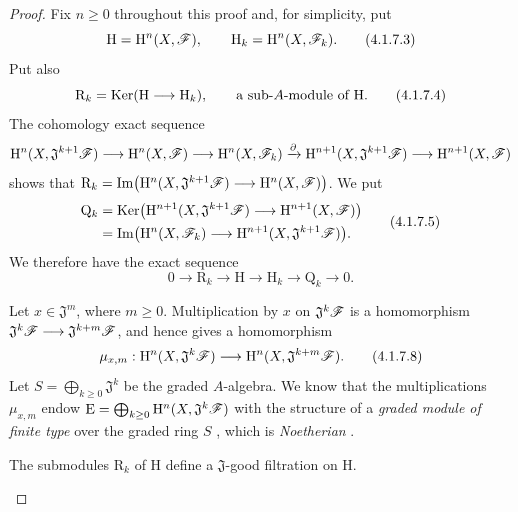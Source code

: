 \begin{proof}
Fix $n\geq0$ throughout this proof and, for simplicity, put
\[
  \mathrm{H}=\mathrm{H}^n(X,\mathscr{F}),
  \qquad
  \mathrm{H}_k=\mathrm{H}^n(X,\mathscr{F}_k).
  \tag{4.1.7.3}
  \label{III.4.1.7.3}
\]
Put also
\[
  \mathrm{R}_k
  =
  \operatorname{Ker}(\mathrm{H}\longrightarrow\mathrm{H}_k),
  \qquad
  \text{a sub-$A$-module of $\mathrm{H}$.}
  \tag{4.1.7.4}
  \label{III.4.1.7.4}
\]
The cohomology exact sequence
\[
  \mathrm{H}^n(X,\mathfrak{J}^{k+1}\mathscr{F})
  \longrightarrow
  \mathrm{H}^n(X,\mathscr{F})
  \longrightarrow
  \mathrm{H}^n(X,\mathscr{F}_k)
  \xrightarrow{\partial}
  \mathrm{H}^{n+1}(X,\mathfrak{J}^{k+1}\mathscr{F})
  \longrightarrow
  \mathrm{H}^{n+1}(X,\mathscr{F})
\]
shows that $\mathrm{R}_k
=
\operatorname{Im}\bigl(
\mathrm{H}^n(X,\mathfrak{J}^{k+1}\mathscr{F})
\longrightarrow
\mathrm{H}^n(X,\mathscr{F})
\bigr)$.
We put
\[
  \begin{split}
  \mathrm{Q}_k
  &=
  \operatorname{Ker}\bigl(
    \mathrm{H}^{n+1}(X,\mathfrak{J}^{k+1}\mathscr{F})
    \longrightarrow
    \mathrm{H}^{n+1}(X,\mathscr{F})
  \bigr)
  \\
  &=
  \operatorname{Im}\bigl(
    \mathrm{H}^n(X,\mathscr{F}_k)
    \longrightarrow
    \mathrm{H}^{n+1}(X,\mathfrak{J}^{k+1}\mathscr{F})
  \bigr).
  \end{split}
  \tag{4.1.7.5}
  \label{III.4.1.7.5}
\]
We therefore have the exact sequence
\[
  0\longrightarrow\mathrm{R}_k
  \longrightarrow\mathrm{H}
  \longrightarrow\mathrm{H}_k
  \longrightarrow\mathrm{Q}_k
  \longrightarrow0.
  \tag{4.1.7.6}
  \label{III.4.1.7.6}
\]

\begin{env}[4.1.7.7]
\label{III.4.1.7.7}
Let $x\in\mathfrak{J}^m$, where $m\geq0$.
Multiplication by $x$ on $\mathfrak{J}^k\mathscr{F}$ is a homomorphism $\mathfrak{J}^k\mathscr{F}
\longrightarrow
\mathfrak{J}^{k+m}\mathscr{F}$,
and hence gives a homomorphism
\[
  \mu_{x,m}:
  \mathrm{H}^n(X,\mathfrak{J}^k\mathscr{F})
  \longrightarrow
  \mathrm{H}^n(X,\mathfrak{J}^{k+m}\mathscr{F}).
  \tag{4.1.7.8}
  \label{III.4.1.7.8}
\]
Let $S=\bigoplus_{k\geq0}\mathfrak{J}^k$
be the graded $A$-algebra.
We know that the multiplications $\mu_{x,m}$ endow $\mathrm{E}
=
\bigoplus_{k\geq0}
\mathrm{H}^n(X,\mathfrak{J}^k\mathscr{F})$
with the structure of a \emph{graded module of finite type} over the graded ring $S$
, which is \emph{Noetherian}
.
\end{env}

\begin{lemma}[4.1.7.9]
\label{III.4.1.7.9}
The submodules $\mathrm{R}_k$ of $\mathrm{H}$ define a
$\mathfrak{J}$-good filtration on $\mathrm{H}$.
\end{lemma}


\end{proof}
